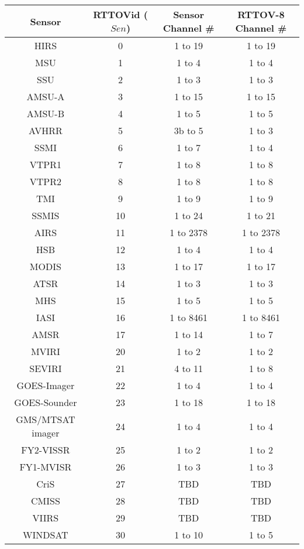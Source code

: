 \begin{center}\begin{tabular}{|c|c|c|c|}
\hline
Sensor & RTTOVid ($Sen$) & Sensor Channel \# & RTTOV-8 Channel \# \\
\hline
HIRS & 0 &  1 to 19 & 1 to 19 \\
MSU & 1 &  1 to 4 & 1 to 4 \\
SSU & 2 &  1 to 3 & 1 to 3 \\
AMSU-A & 3 &  1 to 15 & 1 to 15 \\
AMSU-B & 4 &  1 to 5 & 1 to 5 \\
AVHRR & 5 &  3b to 5 & 1 to 3 \\
SSMI & 6 &  1 to 7 & 1 to 4 \\
VTPR1 & 7 &  1 to 8 & 1 to 8 \\
VTPR2 & 8 &  1 to 8 & 1 to 8 \\
TMI & 9 &  1 to 9 & 1 to 9 \\
SSMIS & 10 &  1 to 24 & 1 to 21 \\
AIRS & 11 &  1 to 2378 & 1 to 2378 \\
HSB & 12 &  1 to 4 & 1 to 4 \\
MODIS & 13 &  1 to 17 & 1 to 17 \\
ATSR & 14 &  1 to 3 & 1 to 3 \\
MHS & 15 &  1 to 5 & 1 to 5 \\
IASI & 16 &  1 to 8461 & 1 to 8461 \\
AMSR & 17 &  1 to 14 & 1 to 7 \\
MVIRI & 20 &  1 to 2 & 1 to 2 \\
SEVIRI & 21 &  4 to 11 & 1 to 8 \\
GOES-Imager & 22  & 1 to 4 & 1 to 4 \\
GOES-Sounder & 23  & 1 to 18 & 1 to 18 \\
GMS/MTSAT
imager & 24  & 1 to 4 & 1 to 4 \\
FY2-VISSR  &25  & 1 to 2 & 1 to 2 \\
FY1-MVISR  &26  & 1 to 3 & 1 to 3 \\
CriS  & 27  & TBD & TBD \\
CMISS & 28  & TBD & TBD \\
VIIRS & 29  & TBD & TBD \\
WINDSAT  & 30  & 1 to 10 & 1 to 5 \\
\hline
\end{tabular}
\end{center}


